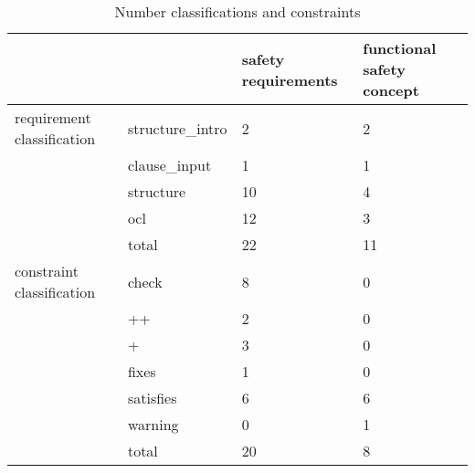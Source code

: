 \documentclass[a4paper]{article}
\begin{document}
\begin{table}[]
\centering
\begin{tabular}{ll|l|l|}
\cline{3-4}
                                                 &                  & safety requirements & functional safety concept \\ \hline
\multicolumn{1}{|l|}{requirement classification} & structure\_intro & 2                   & 2                         \\ \cline{2-4} 
\multicolumn{1}{|l|}{}                           & clause\_input    & 1                   & 1                         \\ \cline{2-4} 
\multicolumn{1}{|l|}{}                           & structure        & 10                  & 4                         \\ \cline{2-4} 
\multicolumn{1}{|l|}{}                           & ocl              & 12                  & 3                         \\ \cline{2-4} 
\multicolumn{1}{|l|}{}                           & total            & 22                  & 11                        \\ \hline
\multicolumn{1}{|l|}{constraint classification}                & check            & 8                   & 0                         \\ \cline{2-4} 
\multicolumn{1}{|l|}{}                           & ++               & 2                   & 0                         \\ \cline{2-4} 
\multicolumn{1}{|l|}{}                           & +                & 3                   & 0                         \\ \cline{2-4} 
\multicolumn{1}{|l|}{}                           & fixes            & 1                   & 0                         \\ \cline{2-4} 
\multicolumn{1}{|l|}{}                           & satisfies        & 6                   & 6                         \\ \cline{2-4} 
\multicolumn{1}{|l|}{}                           & warning          & 0                   & 1                         \\ \cline{2-4} 
\multicolumn{1}{|l|}{}                           & total            & 20                  & 8                         \\ \hline
\end{tabular}
\caption{Number classifications and constraints} \label{tbl:constraint-count}
\end{table}
\end{document}
